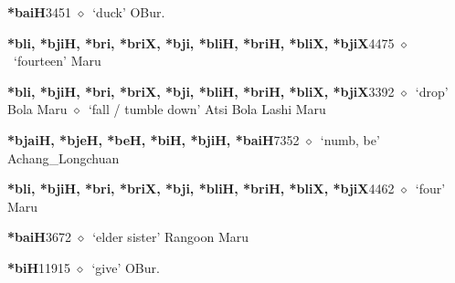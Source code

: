   \begin{list}{}{\leftmargin=1.5em \itemindent=-1.5em}
  \item {\footnotesize \textbf{*baiH}}{\tiny 3451}
         $\diamond$~`duck'
         OBur. 
  \item {\footnotesize \textbf{*bli, *bjiH, *bri, *briX, *bji, *bliH, *briH, *bliX, *bjiX}}{\tiny 4475}
\hspace{1ex}
         $\diamond$~`fourteen'
         Maru 
  \item {\footnotesize \textbf{*bli, *bjiH, *bri, *briX, *bji, *bliH, *briH, *bliX, *bjiX}}{\tiny 3392}
\hspace{1ex}
         $\diamond$~`drop'
         Bola 
\hspace{1ex}
         Maru 
\hspace{1ex}
         $\diamond$~`fall / tumble down'
         Atsi 
\hspace{1ex}
         Bola 
\hspace{1ex}
         Lashi 
\hspace{1ex}
         Maru 
  \item {\footnotesize \textbf{*bjaiH, *bjeH, *beH, *biH, *bjiH, *baiH}}{\tiny 7352}
\hspace{1ex}
         $\diamond$~`numb, be'
         Achang\_Longchuan 
  \item {\footnotesize \textbf{*bli, *bjiH, *bri, *briX, *bji, *bliH, *briH, *bliX, *bjiX}}{\tiny 4462}
\hspace{1ex}
         $\diamond$~`four'
         Maru 
  \item {\footnotesize \textbf{*baiH}}{\tiny 3672}
\hspace{1ex}
         $\diamond$~`elder sister'
         Rangoon 
\hspace{1ex}
         Maru 
  \item {\footnotesize \textbf{*biH}}{\tiny 11915}
\hspace{1ex}
         $\diamond$~`give'
         OBur. 
\hspace{1ex}

\end{list}
